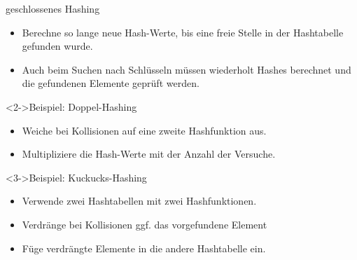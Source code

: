 \begin{frame}
    \begin{block}{geschlossenes Hashing}
        \begin{itemize}
            \item Berechne so lange neue Hash-Werte, bis eine freie Stelle
                  in der Hashtabelle gefunden wurde.
            \item Auch beim Suchen nach Schlüsseln müssen wiederholt Hashes berechnet
                  und die gefundenen Elemente geprüft werden.
        \end{itemize}
    \end{block}
    \begin{block}<2->{Beispiel: Doppel-Hashing}
        \begin{itemize}
            \item Weiche bei Kollisionen auf eine zweite Hashfunktion aus.
            \item Multipliziere die Hash-Werte mit der Anzahl der Versuche.
        \end{itemize}
    \end{block}
    \begin{block}<3->{Beispiel: Kuckucks-Hashing}
        \begin{itemize}
            \item Verwende zwei Hashtabellen mit zwei Hashfunktionen.
            \item Verdränge bei Kollisionen ggf. das vorgefundene Element
            \item Füge verdrängte Elemente in die andere Hashtabelle ein.
        \end{itemize}
    \end{block}
\end{frame}

